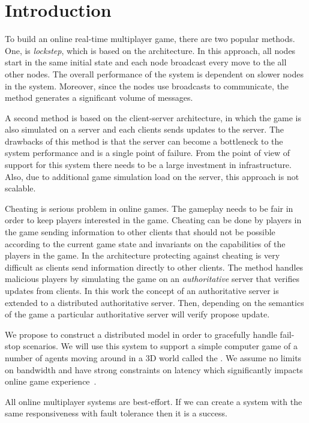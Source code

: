 
\section{Introduction}
\label{sec:Intro}

To build an online real-time multiplayer game, there are two popular methods.
One, is \ptoP \emph{lockstep}, which is based on the \ptoP architecture.
In this approach, all nodes start in the same initial state and each node broadcast every move to the all other nodes.
The overall performance of the system is dependent on slower nodes in the system.
Moreover, since the nodes use broadcasts to communicate, the method generates a significant volume of messages.

A second method is based on the client-server architecture, in which the game is also simulated on a server and each clients sends updates to the server.
The drawbacks of this method is that the server can become a bottleneck to the system performance and is a single point of failure.
From the point of view of support for this system there needs to be a large investment in infrastructure.
Also, due to additional game simulation load on the server, this approach is not scalable.

Cheating is serious problem in online games.
The gameplay needs to be fair in order to keep players interested in the game. 
Cheating can be done by players in the game sending information to other clients that should not be possible according to the current game state and invariants on the capabilities of the players in the game.
In the \ptoP architecture protecting against cheating is very difficult as clients send information directly to other clients.
The \clientServer method handles malicious players by simulating the game on an \emph{authoritative} server that verifies updates from clients.
In this work the concept of an authoritative server is extended to a distributed authoritative server.
Then, depending on the semantics of the game a particular authoritative server will verify propose \gamestate update.

We propose to construct a distributed \clientServer model in order to gracefully handle fail-stop scenarios.
We will use this system to support a simple computer game of a number of agents moving around in a 3D world called the \gamestate.
We assume no limits on bandwidth and have strong constraints on latency which significantly impacts online game experience~\cite{Claypool:2006:LPA:1167838.1167860}.

All online multiplayer systems are best-effort.
If we can create a system with the same responsiveness with fault tolerance then it is a success.

	

